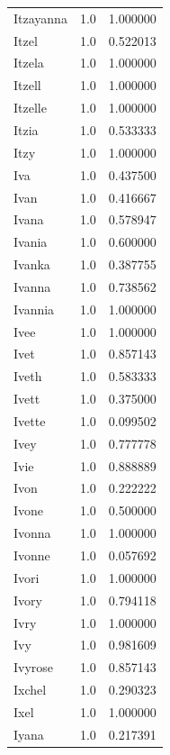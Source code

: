 \documentclass[
  letterpaper,
  DIV=11,
  numbers=noendperiod]{scrreprt}
\begin{document}
\begin{tabular}{lrr}
Itzayanna       &   1.0 &   1.000000 \\
Itzel           &   1.0 &   0.522013 \\
Itzela          &   1.0 &   1.000000 \\
Itzell          &   1.0 &   1.000000 \\
Itzelle         &   1.0 &   1.000000 \\
Itzia           &   1.0 &   0.533333 \\
Itzy            &   1.0 &   1.000000 \\
Iva             &   1.0 &   0.437500 \\
Ivan            &   1.0 &   0.416667 \\
Ivana           &   1.0 &   0.578947 \\
Ivania          &   1.0 &   0.600000 \\
Ivanka          &   1.0 &   0.387755 \\
Ivanna          &   1.0 &   0.738562 \\
Ivannia         &   1.0 &   1.000000 \\
Ivee            &   1.0 &   1.000000 \\
Ivet            &   1.0 &   0.857143 \\
Iveth           &   1.0 &   0.583333 \\
Ivett           &   1.0 &   0.375000 \\
Ivette          &   1.0 &   0.099502 \\
Ivey            &   1.0 &   0.777778 \\
Ivie            &   1.0 &   0.888889 \\
Ivon            &   1.0 &   0.222222 \\
Ivone           &   1.0 &   0.500000 \\
Ivonna          &   1.0 &   1.000000 \\
Ivonne          &   1.0 &   0.057692 \\
Ivori           &   1.0 &   1.000000 \\
Ivory           &   1.0 &   0.794118 \\
Ivry            &   1.0 &   1.000000 \\
Ivy             &   1.0 &   0.981609 \\
Ivyrose         &   1.0 &   0.857143 \\
Ixchel          &   1.0 &   0.290323 \\
Ixel            &   1.0 &   1.000000 \\
Iyana           &   1.0 &   0.217391 \\

\end{tabular}
\end{document}
